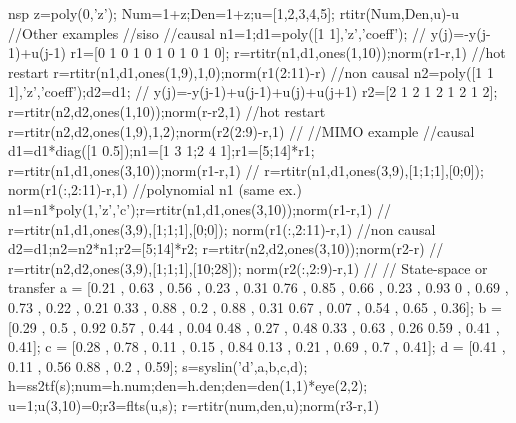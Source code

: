 \begin{examples}
  \begin{mintednsp}{nsp}
    z=poly(0,'z');
    Num=1+z;Den=1+z;u=[1,2,3,4,5];
    rtitr(Num,Den,u)-u
    //Other examples
    //siso
    //causal
    n1=1;d1=poly([1 1],'z','coeff');       // y(j)=-y(j-1)+u(j-1)
    r1=[0 1 0 1 0 1 0 1 0 1 0];
    r=rtitr(n1,d1,ones(1,10));norm(r1-r,1)
    //hot restart
    r=rtitr(n1,d1,ones(1,9),1,0);norm(r1(2:11)-r)
    //non causal
    n2=poly([1 1 1],'z','coeff');d2=d1;    // y(j)=-y(j-1)+u(j-1)+u(j)+u(j+1)
    r2=[2 1 2 1 2 1 2 1 2];
    r=rtitr(n2,d2,ones(1,10));norm(r-r2,1)
    //hot restart
    r=rtitr(n2,d2,ones(1,9),1,2);norm(r2(2:9)-r,1)
    //
    //MIMO example
    //causal
    d1=d1*diag([1 0.5]);n1=[1 3 1;2 4 1];r1=[5;14]*r1;
    r=rtitr(n1,d1,ones(3,10));norm(r1-r,1)
    //
    r=rtitr(n1,d1,ones(3,9),[1;1;1],[0;0]);
    norm(r1(:,2:11)-r,1)
    //polynomial n1  (same ex.)
    n1=n1*poly(1,'z','c');r=rtitr(n1,d1,ones(3,10));norm(r1-r,1)
    //
    r=rtitr(n1,d1,ones(3,9),[1;1;1],[0;0]);
    norm(r1(:,2:11)-r,1)
    //non causal
    d2=d1;n2=n2*n1;r2=[5;14]*r2;
    r=rtitr(n2,d2,ones(3,10));norm(r2-r)
    //
    r=rtitr(n2,d2,ones(3,9),[1;1;1],[10;28]);
    norm(r2(:,2:9)-r,1)
    //
    //  State-space or transfer
    a = [0.21 , 0.63 , 0.56 , 0.23 , 0.31
      0.76 , 0.85 , 0.66 , 0.23 , 0.93
      0 , 0.69 , 0.73 , 0.22 , 0.21
      0.33 , 0.88 , 0.2 , 0.88 , 0.31
      0.67 , 0.07 , 0.54 , 0.65 , 0.36];
    b = [0.29 , 0.5 , 0.92
      0.57 , 0.44 , 0.04
      0.48 , 0.27 , 0.48
      0.33 , 0.63 , 0.26
      0.59 , 0.41 , 0.41];
    c = [0.28 , 0.78 , 0.11 , 0.15 , 0.84
      0.13 , 0.21 , 0.69 , 0.7 , 0.41];
    d = [0.41 , 0.11 , 0.56
      0.88 , 0.2 , 0.59];
    s=syslin('d',a,b,c,d);
    h=ss2tf(s);num=h.num;den=h.den;den=den(1,1)*eye(2,2);
    u=1;u(3,10)=0;r3=flts(u,s);
    r=rtitr(num,den,u);norm(r3-r,1)
  \end{mintednsp}
\end{examples}
\begin{manseealso}
      
\end{manseealso}
